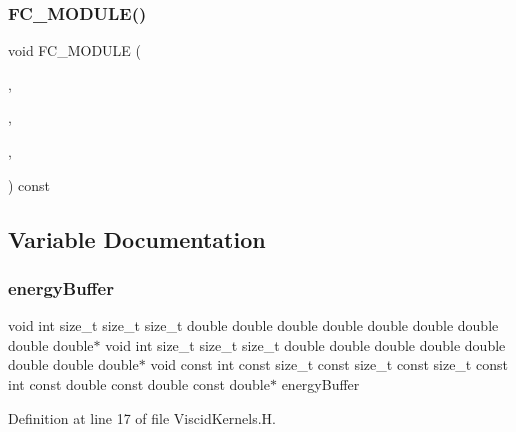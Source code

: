 \hypertarget{ViscidKernels_8H_a0a1716a9309bfc8722490626f294ab4c}{}\label{ViscidKernels_8H_a0a1716a9309bfc8722490626f294ab4c} 
\subsubsection{\texorpdfstring{F\+C\+\_\+\+M\+O\+D\+U\+L\+E()}{FC\_MODULE()}\hspace{0.1cm}{\footnotesize\ttfamily [4/4]}}
{\footnotesize\ttfamily void F\+C\+\_\+\+M\+O\+D\+U\+LE (\begin{DoxyParamCaption}\item[{viscid}]{,  }\item[{scalarflux1d}]{,  }\item[{V\+I\+S\+C\+ID}]{,  }\item[{S\+C\+A\+L\+A\+R\+F\+L\+U\+X1D}]{ }\end{DoxyParamCaption}) const}



\subsection{Variable Documentation}
\hypertarget{ViscidKernels_8H_a19a1cdfafabea8c3529fb1f5f0f12fcc}{}\label{ViscidKernels_8H_a19a1cdfafabea8c3529fb1f5f0f12fcc} 
\subsubsection{\texorpdfstring{energy\+Buffer}{energyBuffer}}
{\footnotesize\ttfamily void int size\+\_\+t size\+\_\+t size\+\_\+t double double double double double double double double double$\ast$ void int size\+\_\+t size\+\_\+t size\+\_\+t double double double double double double double double$\ast$ void const int const size\+\_\+t const size\+\_\+t const size\+\_\+t const int const double const double const double$\ast$ energy\+Buffer}



Definition at line 17 of file Viscid\+Kernels.\+H.

\hypertarget{ViscidKernels_8H_abbdaff041c5151009f87fbae1b58e666}{}\label{ViscidKernels_8H_abbdaff041c5151009f87fbae1b58e666} 
